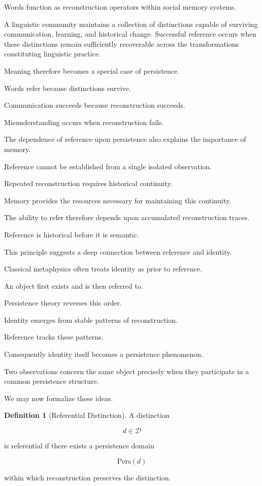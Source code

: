 \documentclass[12pt,oneside]{article}
\theoremstyle{definition}
\newtheorem{definition}[theorem]{Definition} \newtheorem{axiom}[theorem]{Axiom} \newtheorem{remark}[theorem]{Remark} \newtheorem{example}[theorem]{Example}
\begin{document}
Words function as reconstruction operators within social memory systems.

A linguistic community maintains a collection of distinctions capable of surviving communication, learning, and historical change. Successful reference occurs when these distinctions remain sufficiently recoverable across the transformations constituting linguistic practice.

Meaning therefore becomes a special case of persistence.

Words refer because distinctions survive.

Communication succeeds because reconstruction succeeds.

Misunderstanding occurs when reconstruction fails.

The dependence of reference upon persistence also explains the importance of memory.

Reference cannot be established from a single isolated observation.

Repeated reconstruction requires historical continuity.

Memory provides the resources necessary for maintaining this continuity.

The ability to refer therefore depends upon accumulated reconstruction traces.

Reference is historical before it is semantic.

This principle suggests a deep connection between reference and identity.

Classical metaphysics often treats identity as prior to reference.

An object first exists and is then referred to.

Persistence theory reverses this order.

Identity emerges from stable patterns of reconstruction.

Reference tracks these patterns.

Consequently identity itself becomes a persistence phenomenon.

Two observations concern the same object precisely when they participate in a common persistence structure.

We may now formalize these ideas.

\begin{definition}[Referential Distinction]

A distinction

\[
d \in \mathcal D
\]

is referential if there exists a persistence domain

\[
\mathrm{Pers}(d)
\]

within which reconstruction preserves the distinction.

\end{definition}
\end{document}
